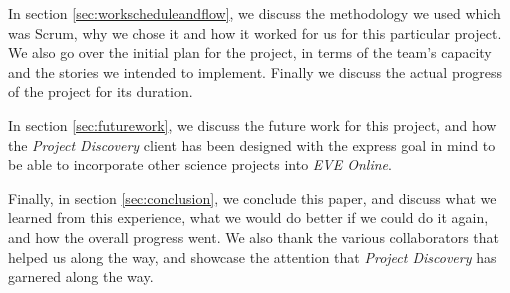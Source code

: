 In section \ref{sec:workscheduleandflow}, we discuss the methodology we used which was Scrum, why we chose it and how it worked for us for this particular project. We also go over the initial plan for the project, in terms of the team's capacity and the stories we intended to implement. Finally we discuss the actual progress of the project for its duration.

In section \ref{sec:futurework}, we discuss the future work for this project, and how the \emph{Project Discovery} client has been designed with the express goal in mind to be able to incorporate other science projects into \emph{EVE Online}.

Finally, in section \ref{sec:conclusion}, we conclude this paper, and discuss what we learned from this experience, what we would do better if we could do it again, and how the overall progress went. We also thank the various collaborators that helped us along the way, and showcase the attention that \emph{Project Discovery} has garnered along the way.